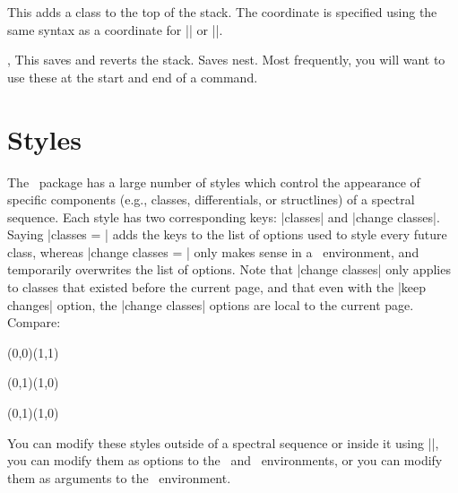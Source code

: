 \begin{sseqdata}[|| name = ex1, cohomological Serre grading]
\begin{command}{\pushstack{}}
This adds a class to the top of the stack. The coordinate is specified using the same syntax as a coordinate for |\structline| or |\replaceclass|.
\end{command}

\begin{commandlist}{\savestack,\restorestack}
This saves and reverts the stack. Saves nest. Most frequently, you will want to use these at the start and end of a command.
\end{commandlist}


\section{Styles}
The \sseqpages\  package has a large number of styles which control the appearance of specific components (e.g., classes, differentials, or structlines) of a spectral sequence. Each style has two corresponding keys: |classes| and |change classes|.  Saying |classes = | adds the keys to the list of options used to style every future class, whereas |change classes = | only makes sense in a \sseqpageenv\  environment, and temporarily overwrites the list of options. Note that |change classes| only applies to classes that existed before the current page, and that even with the |keep changes| option, the |change classes| options are local to the current page. Compare:
\begin{codeexample}[width = 8cm]
\begin{sseqdata}[ name = stylesex ]
\class(0,0)\class(1,1)
\end{sseqdata}
\begin{sseqpage}[ name = stylesex,
                  classes = { fill, blue },
                  title = change new classes ]
\class(0,1)\class(1,0)
\end{sseqpage}
\quad
\begin{sseqpage}[ name = stylesex,
                  change classes = { fill, blue },
                  title = change old classes ]
\class(0,1)\class(1,0)
\end{sseqpage}
\end{codeexample}

You can modify these styles outside of a spectral sequence or inside it using |\sseqset|, you can modify them as options to the \sseqdataenv\  and \sseqpageenv\  environments, or you can modify them as arguments to the \scopeenv\  environment.


\end{sseqdata}
